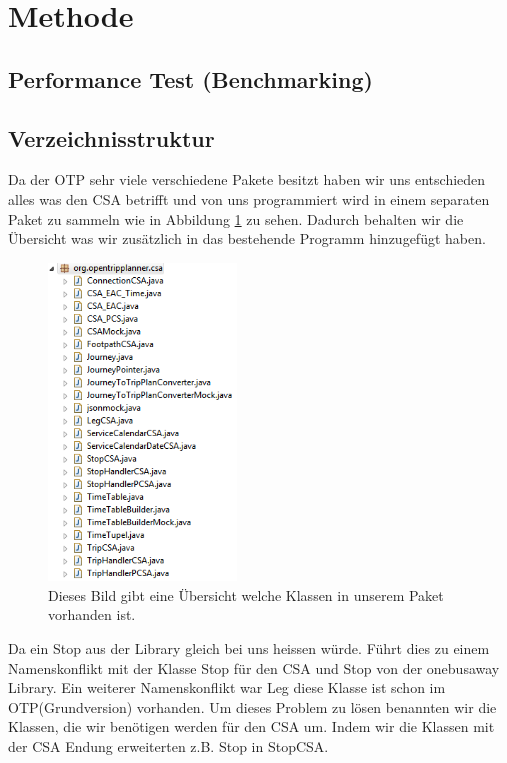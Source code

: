 \section{Methode}

\subsection{Performance Test (Benchmarking)}

\subsection{Verzeichnisstruktur}
Da der OTP sehr viele verschiedene Pakete besitzt haben wir uns entschieden alles was den CSA betrifft und von uns programmiert wird in einem separaten Paket zu sammeln wie in Abbildung \ref{fig:csapackage} zu sehen. Dadurch behalten wir die Übersicht was wir zusätzlich in das bestehende Programm hinzugefügt haben. 

\begin{figure}[h]
	\centering
	\includegraphics[width=5cm]{img/csapackage.png}
	\caption{Dieses Bild gibt eine Übersicht welche Klassen in unserem Paket vorhanden ist.}
	\label{fig:csapackage}
\end{figure}

Da ein Stop aus der Library gleich bei uns heissen würde. Führt dies zu einem Namenskonflikt mit der Klasse Stop für den CSA und Stop von der onebusaway Library. Ein weiterer Namenskonflikt war Leg diese Klasse ist schon im OTP(Grundversion) vorhanden.
Um dieses Problem zu lösen benannten wir die Klassen, die wir benötigen werden für den CSA um. Indem wir die Klassen mit der CSA Endung erweiterten z.B. Stop in StopCSA.\newline

